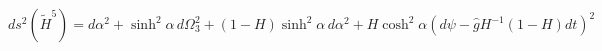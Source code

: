 \begin{equation}
ds^2(\widetilde H^5)=d\alpha^2+\sinh^2\alpha\,d\Omega_3^2
+(1-H)\sinh^2\alpha\,d\alpha^2+H\cosh^2\alpha(d\psi-\hat gH^{-1}(1-H)dt)^2
\end{equation}

